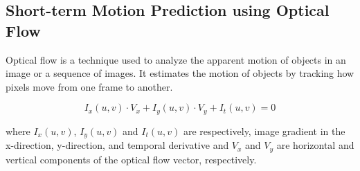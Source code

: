 
\subsection{Short-term Motion Prediction using Optical Flow}
Optical flow is a technique used to analyze the apparent motion of objects in an image or a sequence of images. It estimates the motion of objects by tracking how pixels move from one frame to another.


\begin{equation}
I_x(u, v) \cdot V_x + I_y(u, v) \cdot V_y + I_t(u, v) = 0 
\end{equation}

\noindent 
where
$I_x(u, v)$, $I_y(u, v)$ and $I_t(u, v)$ are respectively, image gradient in the x-direction, y-direction, and temporal derivative and $V_x$ and $V_y$ are horizontal and vertical components of the optical flow vector, respectively.


